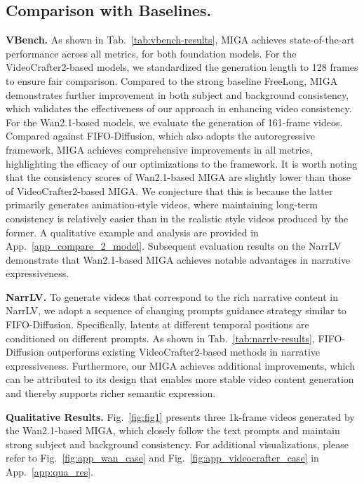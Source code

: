 \documentclass{article}
\theoremstyle{plain}
\theoremstyle{definition}
\theoremstyle{remark}
\begin{document}
\subsection{Comparison with Baselines.}
\label{sota_compare}
\textbf{VBench.}
As shown in Tab.~\ref{tab:vbench-results}, MIGA achieves state-of-the-art performance across all metrics, for both foundation models.
For the VideoCrafter2-based models, we standardized the generation length to 128 frames to ensure fair comparison. Compared to the strong baseline FreeLong, MIGA demonstrates further improvement in both subject and background consistency, which validates the effectiveness of our approach in enhancing video consistency.
For the Wan2.1-based models, we evaluate the generation of 161-frame videos.
Compared against FIFO-Diffusion, which also adopts the autoregressive framework, MIGA achieves comprehensive improvements in all metrics, highlighting the efficacy of our optimizations to the framework.
It is worth noting that the consistency scores of Wan2.1-based MIGA are slightly lower than those of VideoCrafter2-based MIGA. 
We conjecture that this is because the latter primarily generates animation-style videos, where maintaining long-term consistency is relatively easier than in the realistic style videos produced by the former.
A qualitative example and analysis are provided in App.~\ref{app_compare_2_model}.
Subsequent evaluation results on the NarrLV demonstrate that Wan2.1-based MIGA achieves notable advantages in narrative expressiveness.


\textbf{NarrLV.} To generate videos that correspond to the rich narrative content in NarrLV, we adopt a sequence of changing prompts guidance strategy similar to FIFO-Diffusion. 
Specifically, latents at different temporal positions are conditioned on different prompts. 
As shown in Tab.~\ref{tab:narrlv-results}, FIFO-Diffusion outperforms existing VideoCrafter2-based methods in narrative expressiveness. Furthermore, our MIGA achieves additional improvements, which can be attributed to its design that enables more stable video content generation and thereby supports richer semantic expression.

\textbf{Qualitative Results.} 
Fig.~\ref{fig:fig1} presents three 1k-frame videos generated by the Wan2.1-based MIGA, which closely follow the text prompts and maintain strong subject and background consistency. For additional visualizations, please refer to Fig.~\ref{fig:app_wan_case} and Fig.~\ref{fig:app_videocrafter_case} in App.~\ref{app:qua_res}.
\end{document}
